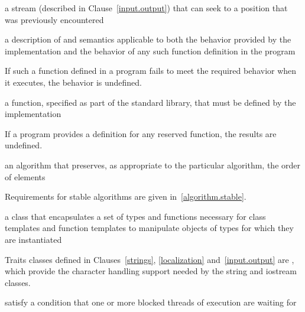 %
a stream (described in Clause~\ref{input.output}) that can seek to a position that was
previously encountered

%
a description of
and
semantics
applicable to both the behavior provided by the implementation and
the behavior of any such function definition in the program\\
\begin{note}
If such a function defined in a \Cpp program fails to meet the required
behavior when it executes, the behavior is undefined.%
\end{note}

%
a function, specified as part of the \Cpp standard library, that must be defined by the
implementation\\
\begin{note}
If a \Cpp program provides a definition for any reserved function, the results are undefined.%
\end{note}

%
%
an algorithm that preserves, as appropriate to the particular algorithm, the order
of elements\\
\begin{note} Requirements for stable algorithms are given in~\ref{algorithm.stable}. \end{note}

%
a class that encapsulates a set of types and functions necessary for class templates and
function templates to manipulate objects of types for which they are instantiated\\
\begin{note}
Traits classes defined in Clauses~\ref{strings}, \ref{localization} and~\ref{input.output} are
, which provide the character handling support needed by the string and
iostream classes.
\end{note}

%
satisfy a condition that one or more blocked threads of execution are waiting for


